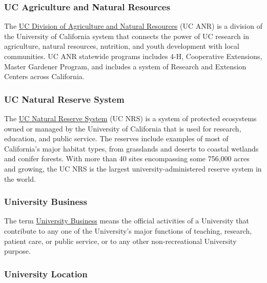 \documentclass[
]{book}
\begin{document}
\hypertarget{ANR}{%
\subsubsection*{UC Agriculture and Natural Resources}\label{ANR}}

The \protect\hyperlink{ANR}{UC Division of Agriculture and Natural Resources} (UC ANR) is a division of the University of California system that connects the power of UC research in agriculture, natural resources, nutrition, and youth development with local communities. UC ANR statewide programs includes 4-H, Cooperative Extensions, Master Gardener Program, and includes a system of Research and Extension Centers across California.



\hypertarget{NRS}{%
\subsubsection*{UC Natural Reserve System}\label{NRS}}

The \protect\hyperlink{NRS}{UC Natural Reserve System} (UC NRS) is a system of protected ecosystems owned or managed by the University of California that is used for research, education, and public service. The reserves include examples of most of California's major habitat types, from grasslands and deserts to coastal wetlands and conifer forests. With more than 40 sites encompassing some 756,000 acres and growing, the UC NRS is the largest university-administered reserve system in the world.



\hypertarget{UB}{%
\subsubsection*{University Business}\label{UB}}

The term \protect\hyperlink{UB}{University Business} means the official activities of a University that contribute to any one of the University's major functions of teaching, research, patient care, or public service, or to any other non-recreational University purpose.



\hypertarget{UL}{%
\subsubsection*{University Location}\label{UL}}
\end{document}
